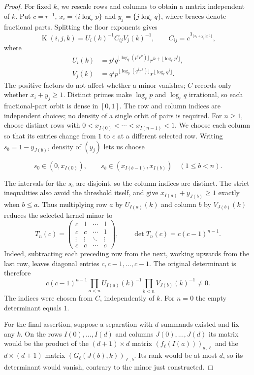 \documentclass[11pt]{article}
\newcommand{\Kernel}{\operatorname{K}}
\begin{document}
\begin{proof}
For fixed $k$, we rescale rows and columns to obtain a matrix independent
of $k$.  Put $c=r^{-1}$, $x_i=\{i\log_r p\}$ and $y_j=\{j\log_r q\}$,
where braces denote fractional parts.  Splitting the floor exponents gives
\[
 \Kernel(i,j,k)=U_i(k)^{-1}C_{ij}V_j(k)^{-1},\qquad
 C_{ij}=c^{\mathbf1_{\{x_i+y_j\ge1\}}},
\]
where
\[
\begin{aligned}
 U_i(k)&=p^i q^{\lfloor\log_q(p^ir^k)\rfloor}
            r^{k+\lfloor\log_r p^i\rfloor},\\
 V_j(k)&=q^j p^{\lfloor\log_p(q^jr^k)\rfloor}
            r^{\lfloor\log_r q^j\rfloor}.
\end{aligned}
\]
The positive factors do not affect whether a minor vanishes; $C$ records
only whether $x_i+y_j\ge1$.  Distinct primes make $\log_r p$ and
$\log_r q$ irrational, so each fractional-part orbit is dense in $[0,1]$.
The row and column indices are independent choices; no density of a
single orbit of pairs is required.  For $n\ge1$, choose distinct rows with
$0<x_{I(0)}<\cdots<x_{I(n-1)}<1$.  We choose each column so that its
entries change from $1$ to $c$ at a different selected row.  Writing
$s_b=1-y_{J(b)}$, density of $(y_j)$ lets us choose

\[
 s_0\in(0,x_{I(0)}),\qquad
 s_b\in(x_{I(b-1)},x_{I(b)})\quad(1\le b<n).
\]

The intervals for the $s_b$ are disjoint, so the column indices are
distinct.  The strict inequalities also avoid the threshold itself, and give
$x_{I(a)}+y_{J(b)}\ge1$ exactly when $b\le a$.  Thus multiplying row $a$
by $U_{I(a)}(k)$ and column $b$ by $V_{J(b)}(k)$ reduces the selected kernel
minor to
\[
 T_n(c)=\begin{pmatrix}
 c&1&\cdots&1\\
 c&c&\cdots&1\\
 \vdots&\vdots&\ddots&\vdots\\
 c&c&\cdots&c
 \end{pmatrix},\qquad
 \det T_n(c)=c(c-1)^{n-1}.
\]
Indeed, subtracting each preceding row from the next, working upwards from
the last row, leaves diagonal entries $c,c-1,\ldots,c-1$.
The original determinant is therefore
\[
 c(c-1)^{n-1}
 \prod_{a<n}U_{I(a)}(k)^{-1}\prod_{b<n}V_{J(b)}(k)^{-1}\ne0.
\]
The indices were chosen from $C$, independently of $k$.  For $n=0$ the
empty determinant equals $1$.

For the final assertion, suppose a separation with $d$ summands existed and
fix any $k$.  On the rows $I(0),\ldots,I(d)$ and columns
$J(0),\ldots,J(d)$ its matrix would be the product of the $(d+1)\times d$
matrix $(f_\ell(I(a)))_{a,\ell}$ and the $d\times(d+1)$ matrix
$(G_\ell(J(b),k))_{\ell,b}$.  Its rank would be at most $d$, so its
determinant would vanish, contrary to the minor just constructed.
\end{proof}
\end{document}
